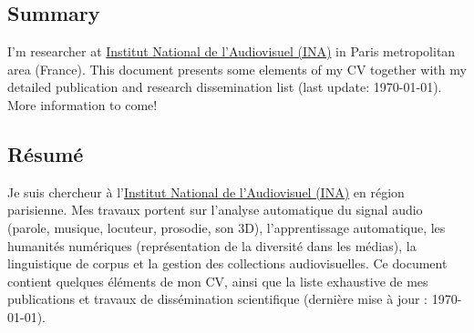 

\begin{en}
\section*{Summary}

I'm researcher at \href{https://www.ina.fr}{Institut National de l'Audiovisuel (INA)} in Paris metropolitan area (France).
This document presents some elements of my CV together with my detailed publication and research dissemination list (last update: \today).
More information to come!
\end{en}

\begin{fr}
\section*{Résumé}

Je suis chercheur à l'\href{https://www.ina.fr}{Institut National de l'Audiovisuel (INA)} en région parisienne.
Mes travaux portent sur l'analyse automatique du signal audio (parole, musique, locuteur, prosodie, son 3D), l'apprentissage automatique, les humanités numériques (représentation de la diversité dans les médias), la linguistique de corpus et la gestion des collections audiovisuelles.
Ce document contient quelques éléments de mon CV, ainsi que la liste exhaustive de mes publications et travaux de dissémination scientifique (dernière mise à jour : \today).
\end{fr}



\tableofcontents


